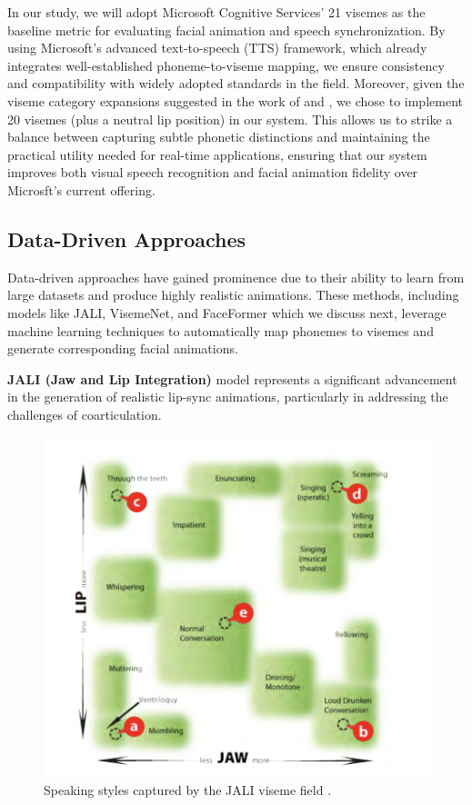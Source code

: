 \documentclass[12pt]{article}
\begin{document}
In our study, we will adopt Microsoft Cognitive Services' 21 visemes  as the baseline metric for evaluating facial animation and speech synchronization. By using Microsoft’s advanced text-to-speech (TTS) framework, which already integrates well-established phoneme-to-viseme mapping, we ensure consistency and compatibility with widely adopted standards in the field. Moreover, given the viseme category expansions suggested in the work of \cite{Xu213} and \cite{cappelletta2012} , we chose to implement 20 visemes (plus a neutral lip position) in our system. This allows us to strike a balance between capturing subtle phonetic distinctions and maintaining the practical utility needed for real-time applications, ensuring that our system improves both visual speech recognition and facial animation fidelity over Microsft's current offering.

\subsection{Data-Driven Approaches}
Data-driven approaches have gained prominence due to their ability to learn from large datasets and produce highly realistic animations. These methods,   including models like JALI, VisemeNet, and FaceFormer which we discuss next, 
leverage machine learning techniques to automatically map phonemes to visemes and generate corresponding facial animations.

{\bf JALI (Jaw and Lip Integration)} model  \cite{Edwards2016}  represents a significant advancement in the generation of realistic lip-sync animations, particularly in addressing the challenges of coarticulation.

\begin{figure}
\centering
\includegraphics[width=\linewidth]{jali.png}
\caption{Speaking styles captured by the JALI viseme field \cite{Edwards2016}.}
\label{fig:jali-viseme-field}
\end{figure}
\end{document}
